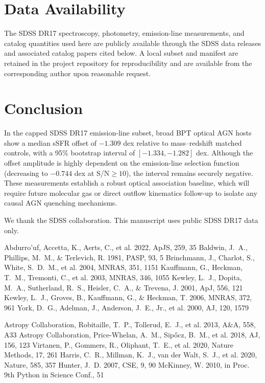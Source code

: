 \documentclass[twocolumn]{aastex631}
\begin{document}
\section{Data Availability}\label{sec:data-avail}
The SDSS DR17 spectroscopy, photometry, emission-line measurements, and catalog quantities used here are publicly available through the SDSS data releases and associated catalog papers cited below. A local subset and manifest are retained in the project repository for reproducibility and are available from the corresponding author upon reasonable request.

\section{Conclusion}\label{sec:conclusion}
In the capped SDSS DR17 emission-line subset, broad BPT optical AGN hosts show a median sSFR offset of $-1.309$ dex relative to mass--redshift matched controls, with a 95\% bootstrap interval of $[-1.334,-1.282]$ dex. Although the offset amplitude is highly dependent on the emission-line selection function (decreasing to $-0.744$ dex at S/N$\geq 10$), the interval remains securely negative. These measurements establish a robust optical association baseline, which will require future molecular gas or direct outflow kinematics follow-up to isolate any causal AGN quenching mechanisms.

\acknowledgments
We thank the SDSS collaboration. This manuscript uses public SDSS DR17 data only.


\begin{thebibliography}{}
 Abdurro'uf, Accetta, K., Aerts, C., et al. 2022, ApJS, 259, 35
 Baldwin, J.~A., Phillips, M.~M., \& Terlevich, R. 1981, PASP, 93, 5
 Brinchmann, J., Charlot, S., White, S.~D.~M., et al. 2004, MNRAS, 351, 1151
 Kauffmann, G., Heckman, T.~M., Tremonti, C., et al. 2003, MNRAS, 346, 1055
 Kewley, L.~J., Dopita, M.~A., Sutherland, R.~S., Heisler, C.~A., \& Trevena, J. 2001, ApJ, 556, 121
 Kewley, L.~J., Groves, B., Kauffmann, G., \& Heckman, T. 2006, MNRAS, 372, 961
 York, D.~G., Adelman, J., Anderson, J.~E., Jr., et al. 2000, AJ, 120, 1579

 Astropy Collaboration, Robitaille, T.~P., Tollerud, E.~J., et al. 2013, A\&A, 558, A33
 Astropy Collaboration, Price-Whelan, A.~M., Sip{\H{o}}cz, B.~M., et al. 2018, AJ, 156, 123
 Virtanen, P., Gommers, R., Oliphant, T.~E., et al. 2020, Nature Methods, 17, 261
 Harris, C.~R., Millman, K.~J., van der Walt, S.~J., et al. 2020, Nature, 585, 357
 Hunter, J.~D. 2007, CSE, 9, 90
 McKinney, W. 2010, in Proc. 9th Python in Science Conf., 51
\end{thebibliography}
\end{document}
